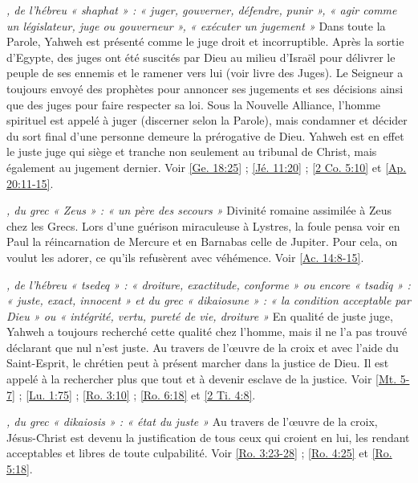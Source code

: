 \begin{multicols}{2}
\textit{, de l'hébreu « shaphat » : « juger, gouverner, défendre, punir », « agir comme un législateur, juge ou gouverneur », « exécuter un jugement »}\newline
Dans toute la Parole, Yahweh est présenté comme le juge droit et incorruptible. Après la sortie d'Egypte, des juges ont été suscités par Dieu au milieu d'Israël pour délivrer le peuple de ses ennemis et le ramener vers lui (voir livre des Juges). Le Seigneur a toujours envoyé des prophètes pour annoncer ses jugements et ses décisions ainsi que des juges pour faire respecter sa loi. Sous la Nouvelle Alliance, l'homme spirituel est appelé à juger (discerner selon la Parole), mais condamner et décider du sort final d'une personne demeure la prérogative de Dieu. Yahweh est en effet le juste juge qui siège et tranche non seulement au tribunal de Christ, mais également au jugement dernier. Voir \vref{Ge. 18:25} ; \vref{Jé. 11:20} ; \vref{2 Co. 5:10} et \vref{Ap. 20:11-15}.

\textit{, du grec « Zeus » : « un père des secours »}\newline
Divinité romaine assimilée à Zeus chez les Grecs. Lors d'une guérison miraculeuse à Lystres, la foule pensa voir en Paul la réincarnation de Mercure et en Barnabas celle de Jupiter. Pour cela, on voulut les adorer, ce qu'ils refusèrent avec véhémence. Voir \vref{Ac. 14:8-15}.

\textit{, de l'hébreu « tsedeq » : « droiture, exactitude, conforme » ou encore « tsadiq » : « juste, exact, innocent » et du grec « dikaiosune » : « la condition acceptable par Dieu » ou « intégrité, vertu, pureté de vie, droiture »}\newline
En qualité de juste juge, Yahweh a toujours recherché cette qualité chez l'homme, mais il ne l'a pas trouvé déclarant que nul n'est juste. Au travers de l'œuvre de la croix et avec l'aide du Saint-Esprit, le chrétien peut à présent marcher dans la justice de Dieu. Il est appelé à la rechercher plus que tout et à devenir esclave de la justice. Voir \vref{Mt. 5-7} ; \vref{Lu. 1:75} ; \vref{Ro. 3:10} ; \vref{Ro. 6:18} et \vref{2 Ti. 4:8}.

\textit{, du grec « dikaiosis » : « état du juste »}\newline
Au travers de l'œuvre de la croix, Jésus-Christ est devenu la justification de tous ceux qui croient en lui, les rendant acceptables et libres de toute culpabilité. Voir \vref{Ro. 3:23-28} ; \vref{Ro. 4:25} et \vref{Ro. 5:18}.


\end{multicols}
